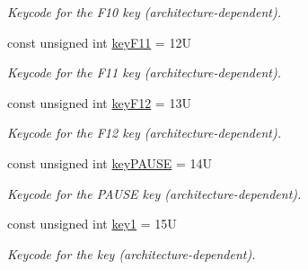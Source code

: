 \begin{DoxyCompactItemize}
\begin{DoxyCompactList}\small\item\em Keycode for the {\ttfamily F10} key (architecture-\/dependent). \end{DoxyCompactList}\item 
\mbox{\label{namespacecimg__library__suffixed_1_1cimg_a566284dafa979a938af58edaae792fe8}} 
const unsigned int \hyperlink{namespacecimg__library__suffixed_1_1cimg_a566284dafa979a938af58edaae792fe8}{key\+F11} = 12U
\begin{DoxyCompactList}\small\item\em Keycode for the {\ttfamily F11} key (architecture-\/dependent). \end{DoxyCompactList}\item 
\mbox{\label{namespacecimg__library__suffixed_1_1cimg_a8a69a5ddd0891e3c898e4a98443b8935}} 
const unsigned int \hyperlink{namespacecimg__library__suffixed_1_1cimg_a8a69a5ddd0891e3c898e4a98443b8935}{key\+F12} = 13U
\begin{DoxyCompactList}\small\item\em Keycode for the {\ttfamily F12} key (architecture-\/dependent). \end{DoxyCompactList}\item 
\mbox{\label{namespacecimg__library__suffixed_1_1cimg_aedfcaf57739f1b5ac9f255edc3c37dc3}} 
const unsigned int \hyperlink{namespacecimg__library__suffixed_1_1cimg_aedfcaf57739f1b5ac9f255edc3c37dc3}{key\+P\+A\+U\+SE} = 14U
\begin{DoxyCompactList}\small\item\em Keycode for the {\ttfamily P\+A\+U\+SE} key (architecture-\/dependent). \end{DoxyCompactList}\item 
\mbox{\label{namespacecimg__library__suffixed_1_1cimg_afd98dc867ce1fab0adaadba418f691ec}} 
const unsigned int \hyperlink{namespacecimg__library__suffixed_1_1cimg_afd98dc867ce1fab0adaadba418f691ec}{key1} = 15U
\begin{DoxyCompactList}\small\item\em Keycode for the {} key (architecture-\/dependent). \end{DoxyCompactList}\item 

\end{DoxyCompactItemize}
